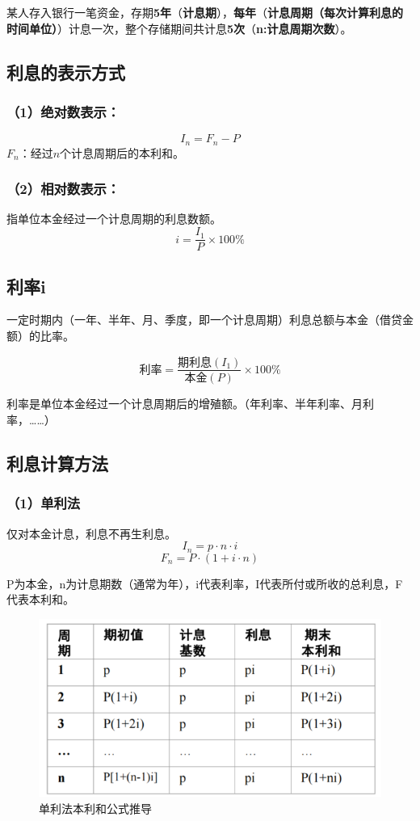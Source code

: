 某人存入银行一笔资金，存期\textbf{5年}（\textbf{计息期}），\textbf{每年}（\textbf{计息周期（每次计算利息的时间单位）}）计息一次，整个存储期间共计息\textbf{5次}（\textbf{n:计息周期次数}）。

\subsection{利息的表示方式}
\subsubsection{（1）绝对数表示：}
$$I_n = F_n - P$$
$F_n$：经过$n$个计息周期后的本利和。
\subsubsection{（2）相对数表示：}
指单位本金经过一个计息周期的利息数额。
$$i = \frac{I_1}{P} \times 100\%$$

\subsection{利率i}

一定时期内（一年、半年、月、季度，即一个计息周期）利息总额与本金（借贷金额）的比率。

$$\mbox{利率} = \frac{\mbox{期利息}(I_1)}{\mbox{本金}(P)} \times 100\%$$

利率是单位本金经过一个计息周期后的增殖额。（年利率、半年利率、月利率，……）

\subsection{利息计算方法}
\subsubsection{（1）单利法}

仅对本金计息，利息不再生利息。
$$I_n= p \cdot n\cdot i$$
$$F_n=P \cdot (1+i \cdot n)$$

P为本金，n为计息期数（通常为年），i代表利率，I代表所付或所收的总利息，F代表本利和。

\begin{figure}[H]
    \centering
    \includegraphics[width=0.9\linewidth]{image/单利法本利和公式推导.png}
    \caption{单利法本利和公式推导}
\end{figure}

